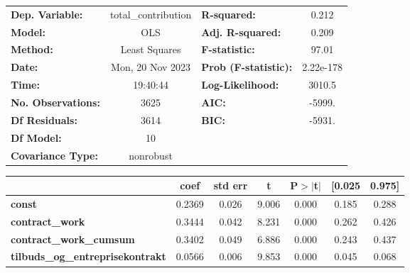 \begin{center}
\begin{tabular}{lclc}
\toprule
\textbf{Dep. Variable:}                  & total\_contribution & \textbf{  R-squared:         } &     0.212   \\
\textbf{Model:}                          &         OLS         & \textbf{  Adj. R-squared:    } &     0.209   \\
\textbf{Method:}                         &    Least Squares    & \textbf{  F-statistic:       } &     97.01   \\
\textbf{Date:}                           &   Mon, 20 Nov 2023  & \textbf{  Prob (F-statistic):} & 2.22e-178   \\
\textbf{Time:}                           &       19:40:44      & \textbf{  Log-Likelihood:    } &    3010.5   \\
\textbf{No. Observations:}               &          3625       & \textbf{  AIC:               } &    -5999.   \\
\textbf{Df Residuals:}                   &          3614       & \textbf{  BIC:               } &    -5931.   \\
\textbf{Df Model:}                       &            10       & \textbf{                     } &             \\
\textbf{Covariance Type:}                &      nonrobust      & \textbf{                     } &             \\
\bottomrule
\end{tabular}
\begin{tabular}{lcccccc}
                                         & \textbf{coef} & \textbf{std err} & \textbf{t} & \textbf{P$> |$t$|$} & \textbf{[0.025} & \textbf{0.975]}  \\
\midrule
\textbf{const}                           &       0.2369  &        0.026     &     9.006  &         0.000        &        0.185    &        0.288     \\
\textbf{contract\_work}                  &       0.3444  &        0.042     &     8.231  &         0.000        &        0.262    &        0.426     \\
\textbf{contract\_work\_cumsum}          &       0.3402  &        0.049     &     6.886  &         0.000        &        0.243    &        0.437     \\
\textbf{tilbuds\_og\_entreprisekontrakt} &       0.0566  &        0.006     &     9.853  &         0.000        &        0.045    &        0.068     \\

\end{tabular}
\end{center}
